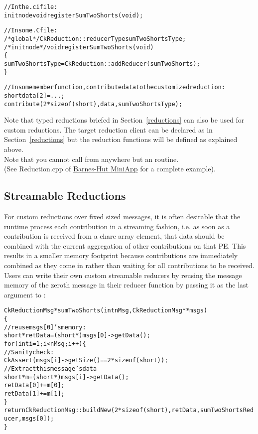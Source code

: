 \begin{alltt}
//In the .ci file:
  initnode void registerSumTwoShorts(void);

//In some .C file:
/*global*/ CkReduction::reducerType sumTwoShortsType;
/*initnode*/ void registerSumTwoShorts(void)
\{
  sumTwoShortsType=CkReduction::addReducer(sumTwoShorts);
\}

//In some member function, contribute data to the customized reduction:
  short data[2]=...;
  contribute(2*sizeof(short),data,sumTwoShortsType);
\end{alltt}
Note that typed reductions briefed in Section~\ref{reductions}
can also be used for custom reductions. The target reduction client 
can be declared as in Section~\ref{reductions} but the reduction functions
will be defined as explained above.\\
Note that you cannot call 
from anywhere but an  routine.\\
(See Reduction.cpp of \href{http://charmplusplus.org/miniApps/#barnes}
{Barnes-Hut MiniApp} for a complete example).


\subsection{Streamable Reductions}

\label{streamable_reductions}

For custom reductions over fixed sized messages, it is often desirable
that the runtime process each contribution in a streaming fashion,
i.e. as soon as a contribution is received from a chare array element,
that data should be combined with the current aggregation of other
contributions on that PE. This results in a smaller memory footprint
because contributions are immediately combined as they come in rather
than waiting for all contributions to be received. Users can write
their own custom streamable reducers by reusing the message memory of
the zeroth message in their reducer function by passing it as the last
argument to :

\begin{alltt}
CkReductionMsg *sumTwoShorts(int nMsg,CkReductionMsg **msgs)
\{
  // reuse msgs[0]'s memory:
  short *retData = (short*)msgs[0]->getData();
  for (int i=1;i<nMsg;i++) \{
    //Sanity check:
    CkAssert(msgs[i]->getSize()==2*sizeof(short));
    //Extract this message's data
    short *m=(short *)msgs[i]->getData();
    retData[0]+=m[0];
    retData[1]+=m[1];
  \}
  return CkReductionMsg::buildNew(2*sizeof(short), retData, sumTwoShortsReducer, msgs[0]);
\}
\end{alltt}


